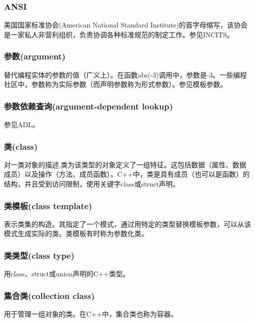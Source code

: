 \subsubsection{ANSI}

美国国家标准协会(American National Standard Institute)的首字母缩写，该协会是一家私人非营利组织，负责协调各种标准规范的制定工作。参见INCITS。

\subsubsection{参数(argument)}

替代编程实体的参数的值（广义上）。在函数abs(-3)调用中，参数是-3。一些编程社区中，参数称为实际参数（而声明参数称为形式参数）。参见模板参数。

\subsubsection{参数依赖查询(argument-dependent lookup)}

参见ADL。

\subsubsection{类(class)}
 
对一类对象的描述,类为该类型的对象定义了一组特征。这包括数据（属性、数据成员）以及操作（方法、成员函数）。C++中，类是具有成员（也可以是函数）的结构，并且受到访问限制，使用关键字class或struct声明。

\subsubsection{类模板(class template)}

表示类集的构造。其指定了一个模式，通过用特定的类型替换模板参数，可以从该模式生成实际的类。类模板有时称为参数化类。

\subsubsection{类类型(class type)}

用class、struct或union声明的C++类型。

\subsubsection{集合类(collection class)}

用于管理一组对象的类。在C++中，集合类也称为容器。

